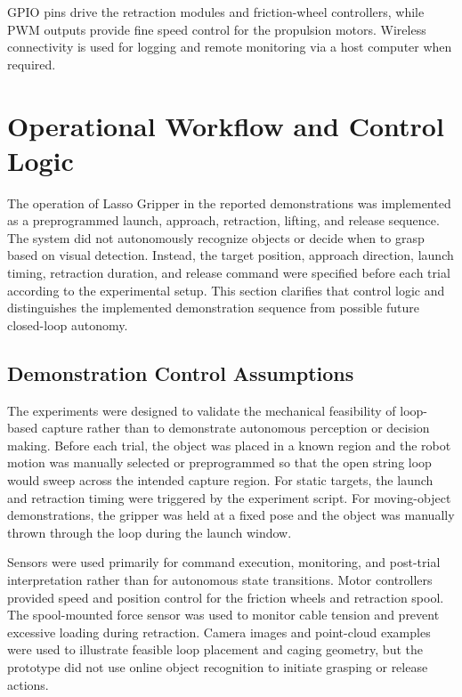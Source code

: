 GPIO pins drive the retraction modules and friction-wheel controllers, while PWM outputs provide fine speed control for the propulsion motors. Wireless connectivity is used for logging and remote monitoring via a host computer when required.

\section{Operational Workflow and Control Logic}
The operation of Lasso Gripper in the reported demonstrations was implemented as a preprogrammed launch, approach, retraction, lifting, and release sequence. The system did not autonomously recognize objects or decide when to grasp based on visual detection. Instead, the target position, approach direction, launch timing, retraction duration, and release command were specified before each trial according to the experimental setup. This section clarifies that control logic and distinguishes the implemented demonstration sequence from possible future closed-loop autonomy.

\subsection{Demonstration Control Assumptions}
The experiments were designed to validate the mechanical feasibility of loop-based capture rather than to demonstrate autonomous perception or decision making. Before each trial, the object was placed in a known region and the robot motion was manually selected or preprogrammed so that the open string loop would sweep across the intended capture region. For static targets, the launch and retraction timing were triggered by the experiment script. For moving-object demonstrations, the gripper was held at a fixed pose and the object was manually thrown through the loop during the launch window.

Sensors were used primarily for command execution, monitoring, and post-trial interpretation rather than for autonomous state transitions. Motor controllers provided speed and position control for the friction wheels and retraction spool. The spool-mounted force sensor was used to monitor cable tension and prevent excessive loading during retraction. Camera images and point-cloud examples were used to illustrate feasible loop placement and caging geometry, but the prototype did not use online object recognition to initiate grasping or release actions.

